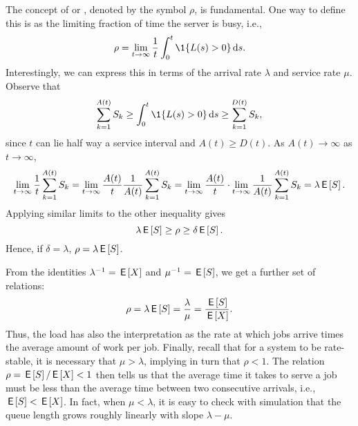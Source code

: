 The concept of  or , denoted by the
symbol $\rho$, is fundamental. One way to define this is  as the limiting
fraction of time the server is busy, i.e.,
\begin{equation*}
  \rho = \lim_{t\to\infty} \frac 1 t \int_0^t \1{L(s)>0} \d s.
\end{equation*}
Interestingly, we can express this in terms of the arrival rate
$\lambda$ and service rate $\mu$. Observe that
\begin{equation*}
  \sum_{k=1}^{A(t)} S_k \geq \int_0^t \1{L(s)>0} \d s \geq   \sum_{k=1}^{D(t)} S_k,
\end{equation*}
since $t$ can lie half way a service interval and $A(t) \geq D(t)$. As
$A(t)\to \infty$ as $t\to\infty$,
\begin{equation*}
  \lim_{t\to\infty} \frac 1 t\sum_{k=1}^{A(t)} S_k = 
  \lim_{t\to\infty} \frac{A(t)}t \frac{1}{A(t)} \sum_{k=1}^{A(t)} S_k = 
  \lim_{t\to\infty} \frac{A(t)}t \cdot \lim_{t\to\infty}\frac{1}{A(t)} \sum_{k=1}^{A(t)} S_k = \lambda \,\mathsf{E}\left[S\right].
\end{equation*}
Applying similar limits to the other inequality gives
\begin{equation*}
\lambda \,\mathsf{E}\left[S\right] \geq \rho \geq \delta \,\mathsf{E}\left[S\right].
\end{equation*}
Hence, if $\delta=\lambda$, $\rho = \lambda \,\mathsf{E}\left[S\right]$.  

From the identities $\lambda^{-1} = \,\mathsf{E}\left[X\right]$ and $\mu^{-1} = \,\mathsf{E}\left[S\right]$, we get
a further set of relations:
\begin{equation*}
  \rho = \lambda \,\mathsf{E}\left[S\right] = \frac{\lambda}{\mu} = \frac{\,\mathsf{E}\left[S\right]}{\,\mathsf{E}\left[X\right]}.
\end{equation*}
Thus, the load has also the interpretation as the rate at which jobs
arrive times the average amount of work per job.  Finally,
recall that for a system to be rate-stable, it is necessary that
$\mu> \lambda$, implying in turn that $\rho < 1$. The relation
$\rho=\,\mathsf{E}\left[S\right]/ \,\mathsf{E}\left[X\right] < 1$ then tells us that the average time it takes to
serve a job must be less than the average time between two consecutive
arrivals, i.e., $\,\mathsf{E}\left[S\right] < \,\mathsf{E}\left[X\right]$. In fact, when $\mu < \lambda$, it is easy to check with simulation that the queue length
grows roughly linearly with slope $\lambda - \mu$.


